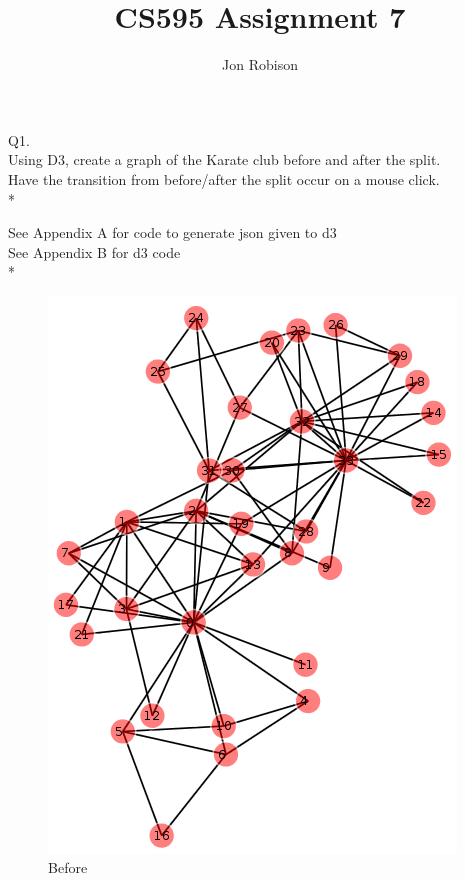 \documentclass{article}
\begin{document}
\author{Jon Robison}
\title{CS595 Assignment 7}
\maketitle

Q1. \\
Using D3, create a graph of the Karate club before and after the split. \\
Have the transition from before/after the split occur on a mouse click. \\*

See Appendix A for code to generate json given to d3 \\
See Appendix B for d3 code \\*

\graphicspath{{q1/}}
\begin{figure}[H]
  \centering
  \caption{Before}
  \includegraphics[scale=.5]{before.png}
\end{figure}
\clearpage
\end{document}

